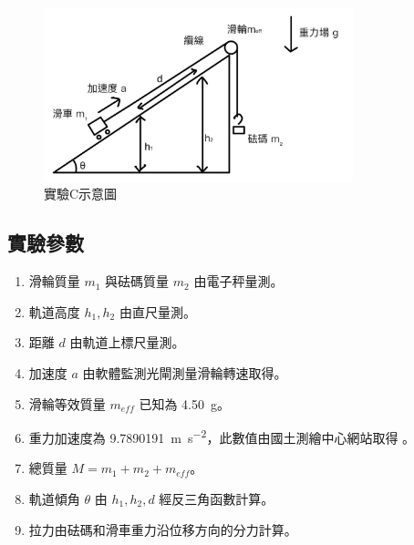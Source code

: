 \documentclass[11pt,a4paper]{article}
\theoremstyle{definition}
\begin{document}
        \begin{figure}[H]
            \centering
            \includegraphics[width=0.8\textwidth]{斜坡示意圖.png}
            \caption{實驗C示意圖}
            \label{fig:實驗C示意圖}
        \end{figure}

        \subsection{實驗參數}
            \begin{enumerate}
                \item 滑輪質量 $m_1$ 與砝碼質量 $m_2$ 由電子秤量測。
                \item 軌道高度 $h_1, h_2$ 由直尺量測。
                \item 距離 $d$ 由軌道上標尺量測。
                \item 加速度 $a$ 由軟體監測光閘測量滑輪轉速取得。
                \item 滑輪等效質量 $m_{eff}$ 已知為 \SI{4.50}{\gram}。
                \item 重力加速度為 \SI{9.7890191}{\meter\per\second\squared}，此數值由國土測繪中心網站取得 \cite{nlsc:twd97}。
                \item 總質量 $M = m_1 + m_2 + m_{eff}$。
                \item 軌道傾角 $\theta$ 由 $h_1, h_2, d$ 經反三角函數計算。
                \item 拉力由砝碼和滑車重力沿位移方向的分力計算。
            \end{enumerate}
\end{document}
